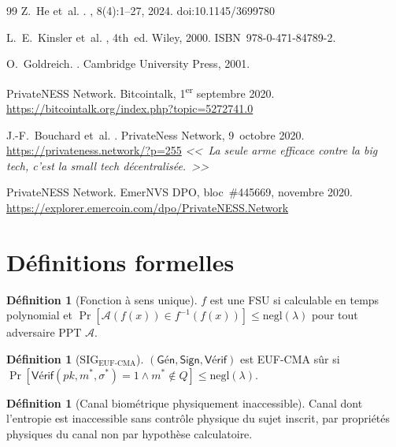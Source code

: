 \documentclass[11pt,a4paper]{article}
\theoremstyle{definition}
\newtheorem{definition}[theorem]{Définition}
\newcommand{\SIG}{\mathrm{SIG}}
\newcommand{\EUFCMA}{\mathrm{EUF\text{-}CMA}}
\newcommand{\negl}{\mathrm{negl}}
\begin{document}
\begin{thebibliography}{99}
Z.~He et~al.
.
, 8(4):1--27, 2024.
\newblock doi:10.1145/3699780

L.~E.~Kinsler et~al.
, 4th~ed.
\newblock Wiley, 2000. ISBN~978-0-471-84789-2.

O.~Goldreich.
.
\newblock Cambridge University Press, 2001.

{PrivateNESS Network}.
\newblock Bitcointalk, 1\textsuperscript{er} septembre 2020.
\newblock \url{https://bitcointalk.org/index.php?topic=5272741.0}

J.-F.~Bouchard et~al.
.
\newblock PrivateNess Network, 9~octobre 2020.
\newblock \url{https://privateness.network/?p=255}
\newblock \textit{<<~La seule arme efficace contre la big tech,
  c'est la small tech décentralisée.~>>}

{PrivateNESS Network}.
\newblock EmerNVS DPO, bloc~\#445669, novembre 2020.
\newblock \url{https://explorer.emercoin.com/dpo/PrivateNESS.Network}

\end{thebibliography}

\appendix

\section{Définitions formelles}
\label{app:defs}

\begin{definition}[Fonction à sens unique]
$f$ est une FSU si calculable en temps polynomial et
$\Pr[\mathcal{A}(f(x)) \in f^{-1}(f(x))] \leq \negl(\lambda)$
pour tout adversaire PPT $\mathcal{A}$.
\end{definition}

\begin{definition}[$\SIG_{\EUFCMA}$]
$(\mathsf{Gén},\mathsf{Sign},\mathsf{Vérif})$ est EUF-CMA sûr si
$\Pr[\mathsf{Vérif}(pk,m^*,\sigma^*)=1 \wedge m^*\notin Q]
\leq \negl(\lambda)$.
\end{definition}

\begin{definition}[Canal biométrique physiquement inaccessible]
\label{def:physical_channel}
Canal dont l'entropie est inaccessible sans contrôle physique du sujet
inscrit, par propriétés physiques du canal non par hypothèse
calculatoire.
\end{definition}
\end{document}
